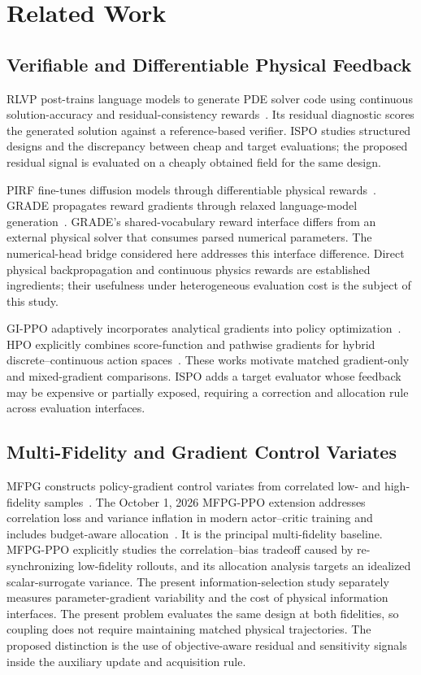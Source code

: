 \section{Related Work}
\subsection{Verifiable and Differentiable Physical Feedback}
RLVP post-trains language models to generate PDE solver code using continuous solution-accuracy and residual-consistency rewards~\cite{cai2026rlvp}. Its residual diagnostic scores the generated solution against a reference-based verifier. ISPO studies structured designs and the discrepancy between cheap and target evaluations; the proposed residual signal is evaluated on a cheaply obtained field for the same design.

PIRF fine-tunes diffusion models through differentiable physical rewards~\cite{yuan2025pirf}. GRADE propagates reward gradients through relaxed language-model generation~\cite{nel2025grade}. GRADE's shared-vocabulary reward interface differs from an external physical solver that consumes parsed numerical parameters. The numerical-head bridge considered here addresses this interface difference. Direct physical backpropagation and continuous physics rewards are established ingredients; their usefulness under heterogeneous evaluation cost is the subject of this study.

GI-PPO adaptively incorporates analytical gradients into policy optimization~\cite{son2023gippo}. HPO explicitly combines score-function and pathwise gradients for hybrid discrete--continuous action spaces~\cite{alvo2026hpo}. These works motivate matched gradient-only and mixed-gradient comparisons. ISPO adds a target evaluator whose feedback may be expensive or partially exposed, requiring a correction and allocation rule across evaluation interfaces.

\subsection{Multi-Fidelity and Gradient Control Variates}
MFPG constructs policy-gradient control variates from correlated low- and high-fidelity samples~\cite{liu2025mfpg}. The October 1, 2026 MFPG-PPO extension addresses correlation loss and variance inflation in modern actor--critic training and includes budget-aware allocation~\cite{liu2026mfpgppo}. It is the principal multi-fidelity baseline. MFPG-PPO explicitly studies the correlation--bias tradeoff caused by re-synchronizing low-fidelity rollouts, and its allocation analysis targets an idealized scalar-surrogate variance. The present information-selection study separately measures parameter-gradient variability and the cost of physical information interfaces. The present problem evaluates the same design at both fidelities, so coupling does not require maintaining matched physical trajectories. The proposed distinction is the use of objective-aware residual and sensitivity signals inside the auxiliary update and acquisition rule.

